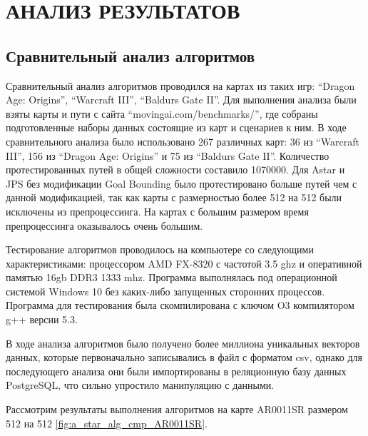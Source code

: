 \section[Анализ результатов]{\MakeTextUppercase{АНАЛИЗ РЕЗУЛЬТАТОВ}}

\subsection{Сравнительный анализ алгоритмов}

Сравнительный анализ алгоритмов проводился на картах из таких игр: ``Dragon Age: Origins'', ``Warcraft III'', ``Baldurs Gate II''. Для выполнения анализа были взяты карты и пути с сайта ``movingai.com/benchmarks/'', где собраны подготовленные наборы данных состоящие из карт и сценариев к ним. В ходе сравнительного анализа было использовано 267 различных карт: 36 из ``Warcraft III'', 156 из ``Dragon Age: Origins'' и 75 из ``Baldurs Gate II''. Количество протестированных путей в общей сложности составило 1070000. Для Astar и JPS без модификации Goal Bounding было протестировано больше путей чем с данной модификацией, так как карты с размерностью более 512 на 512 были исключены из препроцессинга. На картах с большим размером время препроцессинга оказывалось очень большим.

Тестирование алгоритмов проводилось на компьютере со следующими характеристиками: процессором AMD FX-8320 с частотой 3.5 ghz и оперативной памятью 16gb DDR3 1333 mhz. Программа выполнялась под операционной системой Windows 10 без каких-либо запущенных сторонних процессов. Программа для тестирования была скомпилирована с ключом O3 компилятором g++ версии 5.3.  

В ходе анализа алгоритмов было получено более миллиона уникальных векторов данных, которые первоначально записывались в файл с форматом csv, однако для последующего анализа они были импортированы в реляционную базу данных PostgreSQL, что сильно упростило манипуляцию с данными.

Рассмотрим результаты выполнения алгоритмов на карте AR0011SR размером 512 на 512 \cref{fig:a_star_alg_cmp_AR0011SR}.

